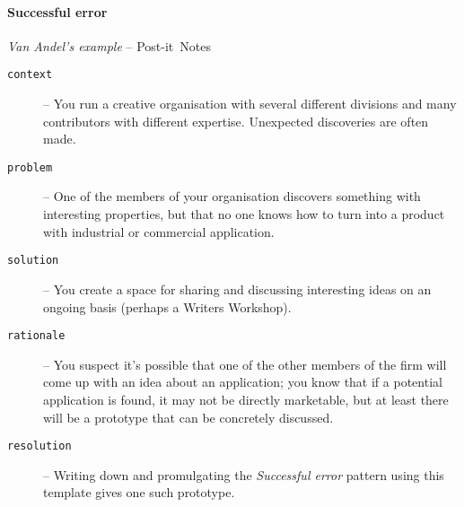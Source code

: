 \begin{mdframed}
\vspace{-.35cm}
\paragraph{Successful error}
\emph{Van Andel's example} -- Post-it\texttrademark\ Notes\\[.05cm]
\begin{description}
\item[{\tt context}] -- You run a creative organisation with several different divisions and many contributors with different expertise.  Unexpected discoveries are often made.
\item[{\tt problem}] -- One of the members of your organisation
  discovers something with interesting properties, but that no one
  knows how to turn into a product with industrial or commercial application.
\item[{\tt solution}] -- You create a space for sharing and discussing
  interesting ideas on an ongoing basis (perhaps a Writers Workshop).
\item[{\tt rationale}] -- You suspect it's possible that one of the
  other members of the firm will come up with an idea about an
  application; you know that if a potential application is found, it
  may not be directly marketable, but at least there will be a
  prototype that can be concretely discussed.
\item[{\tt resolution}] -- Writing down and promulgating the
  \emph{Successful error} pattern using this template gives one such
  prototype.
\end{description}
\end{mdframed}
